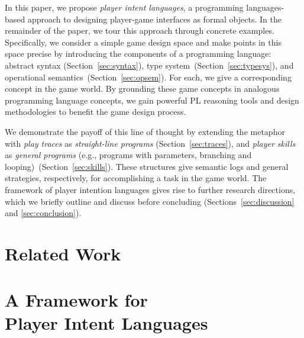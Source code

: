\documentclass[sigconf]{acmart}
\begin{document}
In this paper, we propose \emph{player intent languages}, a
programming languages-based approach to designing player-game
interfaces as formal objects.
%
In the remainder of the paper, we tour this approach through concrete
examples.
%
Specifically, we consider a simple game design space and make points
in this space precise by introducing the components of a programming
language:
%
abstract syntax (Section~\ref{sec:syntax}),
%
type system~(Section~\ref{sec:typesys}), 
%
and operational semantics~(Section~\ref{sec:opsem}).
%
For each, we give a corresponding concept in the game world.
%
By grounding these game concepts in analogous programming language
concepts, we gain powerful PL reasoning tools and design methodologies
to benefit the game design process.

We demonstrate the payoff of this line of thought by extending the
metaphor with \emph{play traces} as \emph{straight-line
  programs} (Section~\ref{sec:traces}), and {\em player skills} as
\emph{general programs} (e.g., programs with parameters, branching and
looping)~(Section~\ref{sec:skills}).
%
These structures give semantic logs and general strategies,
respectively, for accomplishing a task in the game world.
%
The framework of player intention languages gives rise to further research
directions, which we briefly outline and discuss before concluding
(Sections~\ref{sec:discussion} and \ref{sec:conclusion}).


\section{Related Work}



\section{A Framework for \\ Player Intent Languages}
\end{document}
